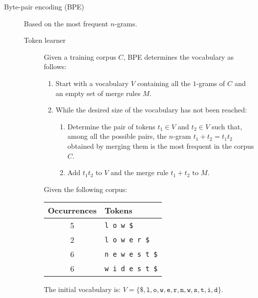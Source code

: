 \begin{description}
    \item[Byte-pair encoding (BPE)] 
        Based on the most frequent $n$-grams.

        \begin{description}
            \item[Token learner]
                Given a training corpus $C$, BPE determines the vocabulary as follows:
                \begin{enumerate}
                    \item Start with a vocabulary $V$ containing all the $1$-grams of $C$ and an empty set of merge rules $M$.
                    \item While the desired size of the vocabulary has not been reached:
                    \begin{enumerate}
                        \item Determine the pair of tokens $t_1 \in V$ and $t_2 \in V$ such that, among all the possible pairs, the $n$-gram $t_1 + t_2 = t_1t_2$ obtained by merging them is the most frequent in the corpus $C$.
                        \item Add $t_1t_2$ to $V$ and the merge rule $t_1+t_2$ to $M$.
                    \end{enumerate}
                \end{enumerate}

                \begin{example}
                    Given the following corpus:
                    \begin{table}[H]
                        \centering
                        \footnotesize
                        \begin{tabular}{cl}
                            \toprule
                            \textbf{Occurrences} & \textbf{Tokens} \\
                            \midrule
                            5 & \texttt{l o w \$} \\
                            2 & \texttt{l o w e r \$} \\
                            6 & \texttt{n e w e s t \$} \\
                            6 & \texttt{w i d e s t \$} \\
                            \bottomrule
                        \end{tabular}
                    \end{table}
                    The initial vocabulary is: $V = \{  \texttt{\$}, \texttt{l}, \texttt{o}, \texttt{w}, \texttt{e}, \texttt{r}, \texttt{n}, \texttt{w}, \texttt{s}, \texttt{t}, \texttt{i}, \texttt{d} \}$.


\end{example}
\end{description}
\end{description}
